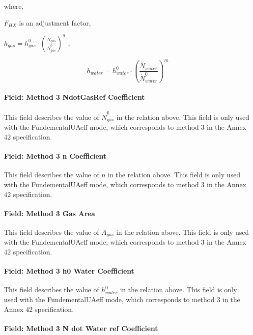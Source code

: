 where,

\({F_{HX}}\) is an adjustment factor,

\({h_{gas}} = h_{gas}^0 \cdot {\left( {\frac{{{{\dot N}_{gas}}}}{{\dot N_{gas}^0}}} \right)^n}\) ,

\begin{equation}
{h_{water}} = h_{water}^0 \cdot {\left( {\frac{{{{\dot N}_{water}}}}{{\dot N_{water}^0}}} \right)^m}
\end{equation}

\paragraph{Field: Method 3 NdotGasRef Coefficient}\label{field-method-3-ndotgasref-coefficient}

This field describes the value of \(\dot N_{gas}^0\) in the relation above. This field is only used with the FundementalUAeff mode, which corresponds to method 3 in the Annex 42 specification.

\paragraph{Field: Method 3 n Coefficient}\label{field-method-3-n-coefficient}

This field describes the value of \(n\) in the relation above. This field is only used with the FundementalUAeff mode, which corresponds to method 3 in the Annex 42 specification.

\paragraph{Field: Method 3 Gas Area}\label{field-method-3-gas-area}

This field describes the value of \({A_{gas}}\) in the relation above. This field is only used with the FundementalUAeff mode, which corresponds to method 3 in the Annex 42 specification.

\paragraph{Field: Method 3 h0 Water Coefficient}\label{field-method-3-h0-water-coefficient}

This field describes the value of \(h_{water}^0\) in the relation above. This field is only used with the FundementalUAeff mode, which corresponds to method 3 in the Annex 42 specification.

\paragraph{Field: Method 3 N dot Water ref Coefficient}\label{field-method-3-n-dot-water-ref-coefficient}

